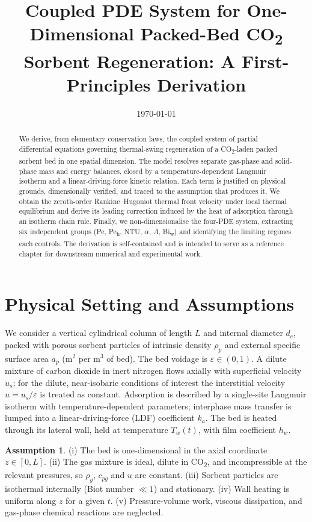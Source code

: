 \documentclass[a4paper,11pt]{amsart}
\title{Coupled PDE System for One-Dimensional Packed-Bed CO\textsubscript{2} Sorbent Regeneration: A First-Principles Derivation}
\date{\today}
\theoremstyle{definition}
\newtheorem{assumption}{Assumption}
\begin{document}
\begin{abstract}
We derive, from elementary conservation laws, the coupled system of partial differential equations governing thermal-swing regeneration of a CO\textsubscript{2}-laden packed sorbent bed in one spatial dimension. The model resolves separate gas-phase and solid-phase mass and energy balances, closed by a temperature-dependent Langmuir isotherm and a linear-driving-force kinetic relation. Each term is justified on physical grounds, dimensionally verified, and traced to the assumption that produces it. We obtain the zeroth-order Rankine--Hugoniot thermal front velocity under local thermal equilibrium and derive its leading correction induced by the heat of adsorption through an isotherm chain rule. Finally, we non-dimensionalise the four-PDE system, extracting six independent groups (Pe, Pe\textsubscript{h}, NTU, $\alpha$, $\Lambda$, Bi\textsubscript{w}) and identifying the limiting regimes each controls. The derivation is self-contained and is intended to serve as a reference chapter for downstream numerical and experimental work.
\end{abstract}

\maketitle

\section{Physical Setting and Assumptions}

We consider a vertical cylindrical column of length $L$ and internal diameter $d_c$, packed with porous sorbent particles of intrinsic density $\rho_p$ and external specific surface area $a_p$ (m$^2$ per m$^3$ of bed). The bed voidage is $\varepsilon \in (0,1)$. A dilute mixture of carbon dioxide in inert nitrogen flows axially with superficial velocity $u_s$; for the dilute, near-isobaric conditions of interest the interstitial velocity $u = u_s/\varepsilon$ is treated as constant. Adsorption is described by a single-site Langmuir isotherm with temperature-dependent parameters; interphase mass transfer is lumped into a linear-driving-force (LDF) coefficient $k_a$. The bed is heated through its lateral wall, held at temperature $T_w(t)$, with film coefficient $h_w$.

\begin{assumption}\label{ass:basic}
(i) The bed is one-dimensional in the axial coordinate $z\in[0,L]$. (ii) The gas mixture is ideal, dilute in CO\textsubscript{2}, and incompressible at the relevant pressures, so $\rho_g$, $c_{pg}$ and $u$ are constant. (iii) Sorbent particles are isothermal internally (Biot number $\ll 1$) and stationary. (iv) Wall heating is uniform along $z$ for a given $t$. (v) Pressure-volume work, viscous dissipation, and gas-phase chemical reactions are neglected.
\end{assumption}
\end{document}

